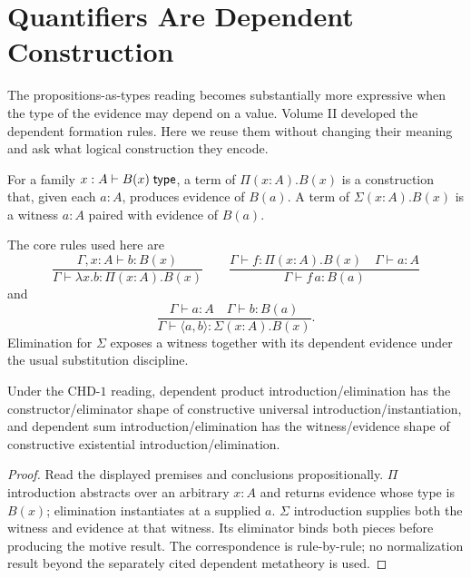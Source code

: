 \chapter{Quantifiers Are Dependent Construction}
\label{ch:quantifiers}

The propositions-as-types reading becomes substantially more expressive when the type of the evidence may depend on a value. Volume II developed the dependent formation rules. Here we reuse them without changing their meaning and ask what logical construction they encode.

For a family $x:A\vdash B(x)\;\mathsf{type}$, a term of $\Pi(x:A).B(x)$ is a construction that, given each $a:A$, produces evidence of $B(a)$. A term of $\Sigma(x:A).B(x)$ is a witness $a:A$ paired with evidence of $B(a)$.



\begin{formal}[title={Dependent universal/existential reading}]
The core rules used here are
\[
\frac{\Gamma,x{:}A\vdash b:B(x)}{\Gamma\vdash\lambda x.b:\Pi(x{:}A).B(x)}
\qquad
\frac{\Gamma\vdash f:\Pi(x{:}A).B(x)\quad\Gamma\vdash a:A}{\Gamma\vdash f\,a:B(a)}
\]
and
\[
\frac{\Gamma\vdash a:A\quad\Gamma\vdash b:B(a)}{\Gamma\vdash\langle a,b\rangle:\Sigma(x{:}A).B(x)}.
\]
Elimination for $\Sigma$ exposes a witness together with its dependent evidence under the usual substitution discipline.
\end{formal}

\begin{proposition}
Under the $\mathrm{CHD}\text{-}1$ reading, dependent product introduction/elimination has the constructor/eliminator shape of constructive universal introduction/instantiation, and dependent sum introduction/elimination has the witness/evidence shape of constructive existential introduction/elimination.
\end{proposition}
\begin{proof}
Read the displayed premises and conclusions propositionally. $\Pi$ introduction abstracts over an arbitrary $x:A$ and returns evidence whose type is $B(x)$; elimination instantiates at a supplied $a$. $\Sigma$ introduction supplies both the witness and evidence at that witness. Its eliminator binds both pieces before producing the motive result. The correspondence is rule-by-rule; no normalization result beyond the separately cited dependent metatheory is used.
\end{proof}

